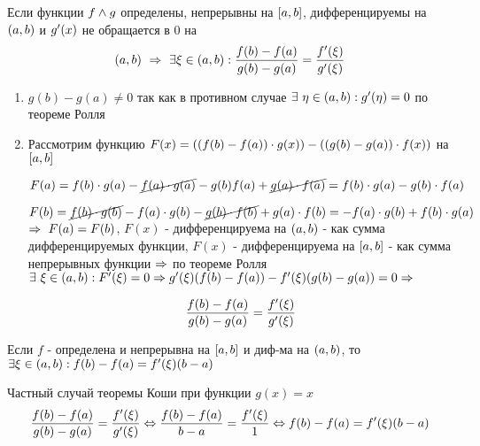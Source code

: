 \begin{proofs}
	Если функции $f \wedge g$ определены, непрерывны на $\left[ a,b\right]$, дифференцируемы на $\left( a,b\right)$ и $g^{\prime}(x)$  не обращается в $0$ на $$\left( a,b\right) \ \Rightarrow \ \exists \xi \in \left( a,b\right): \frac{f(b)-f(a)}{g(b)-g(a)} = \frac{f^{\prime}(\xi)}{g^{\prime}(\xi)}$$

	\begin{dokvo}
		\begin{enumerate}
			\item $g(b) - g(a) \neq 0$ так как в противном случае $\exists \ \eta \in \left( a,b\right): g^{\prime}(\eta) = 0$ по теореме Ролля
			\item Рассмотрим функцию $F(x) = \left( \left( f(b)-f(a)\right)\cdot g(x)\right) - \left( \left( g(b)-g(a)\right)\cdot f(x)\right)$ на $\left[ a,b\right]$

			$F(a) = f(b)\cdot g(a) - \cancel{f(a)\cdot g(a)} - g(b)f(a) + \cancel{g(a)\cdot f(a)} = f(b)\cdot g(a)-g(b)\cdot f(a)$

			$F(b) = \cancel{f(b)\cdot g(b)} - f(a)\cdot g(b) - \cancel{g(b)\cdot f(b)} + g(a)\cdot f(b) = -f(a)\cdot g(b)+f(b)\cdot g(a)$ $\Rightarrow \ F(a) = F(b)$, $F(x)$ - дифференцируема на $\left( a,b\right)$ - как сумма дифференцируемых функции, $F(x)$ - дифференцируема на $\left[ a,b\right]$ - как сумма непрерывных функции $\Rightarrow$ по теореме Ролля $\exists \ \xi \in \left( a,b\right): F^{\prime}(\xi) = 0 \Rightarrow g^{\prime}(\xi)(f(b)-f(a))- f^{\prime}(\xi)(g(b)-g(a)) = 0 \Rightarrow$

			$$\frac{f(b)-f(a)}{g(b)-g(a)} = \frac{f^{\prime}(\xi)}{g^{\prime}(\xi)}$$
		\end{enumerate}
	\end{dokvo}
\end{proofs}

\begin{proofs}
	Если $f$ - определена и непрерывна на $\left[ a,b\right]$ и диф-ма на $\left( a,b\right)$, то $\exists \xi \in \left( a,b\right): f(b) - f(a) = f^{\prime}(\xi)(b-a)$

	\begin{dokvo}
		Частный случай теоремы Коши при функции $g(x) = x$
		$$ \frac{f(b)-f(a)}{g(b)-g(a)} = \frac{f^{\prime}(\xi)}{g^{\prime}(\xi)} \Leftrightarrow \frac{f(b)-f(a)}{b-a} = \frac{f^{\prime}(\xi)}{1} \Leftrightarrow f(b) - f(a) = f^{\prime}(\xi)(b-a)$$
	\end{dokvo}
\end{proofs}
\newpage
